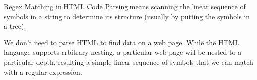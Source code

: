 \documentclass[smaller]{beamer}
\begin{document}
\begin{frame}[label=sec-1-8]{Regex Matching in HTML Code}
Parsing means scanning the linear sequence of symbols in a string to determine its structure (usually by putting the symbols in a tree).

We don't need to parse HTML to find data on a web page. While the HTML \alert{language} supports arbitrary nesting, a particular web page will be nested to a particular depth, resulting a simple linear sequence of symbols that we can match with a regular expression.
\end{frame}
\end{document}
